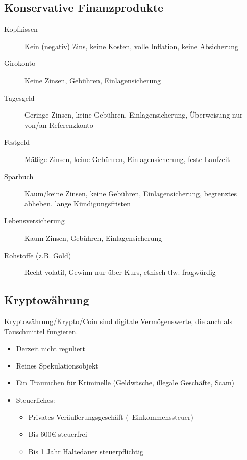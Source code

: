 \documentclass{beamer}
\begin{document}
		\subsection{Konservative Finanzprodukte}
		
			\begin{frame}
				\begin{description}
					\item[Kopfkissen] Kein (negativ) Zins, keine Kosten, volle Inflation, keine Absicherung\pause
					\item[Girokonto] Keine Zinsen, Gebühren, Einlagensicherung\pause
					\item[Tagesgeld] Geringe Zinsen, keine Gebühren, Einlagensicherung, Überweisung nur von/an Referenzkonto\pause
					\item[Festgeld] Mäßige Zinsen, keine Gebühren, Einlagensicherung, feste Laufzeit\pause
					\item[Sparbuch] Kaum/keine Zinsen, keine Gebühren, Einlagensicherung, begrenztes abheben, lange Kündigungsfristen\pause
					\item[Lebensversicherung] Kaum Zinsen, Gebühren, Einlagensicherung\pause
					\item[Rohstoffe (z.B. Gold)] Recht volatil, Gewinn nur über Kurs, ethisch tlw. fragwürdig
				\end{description}
			\end{frame}
		
		\subsection{Kryptowährung}
		
			\begin{frame}
				\begin{definition}
					Kryptowährung/Krypto/Coin sind digitale Vermögenswerte, die auch als Tauschmittel fungieren.\citewiki[Kryptowährung]{Kryptow\%C3\%A4hrung}
				\end{definition}
			
				\begin{itemize}
					\item Derzeit nicht reguliert
					\item Reines Spekulationsobjekt
					\item Ein Träumchen für Kriminelle (Geldwäsche, illegale Geschäfte, Scam)
					\item Steuerliches:
					\begin{itemize}
						\item Privates Veräußerungsgeschäft (\textrightarrow\ Einkommenssteuer)
						\item Bis 600€ steuerfrei
						\item Bis 1 Jahr Haltedauer steuerpflichtig
					\end{itemize}
				\end{itemize}
			\end{frame}
	
\end{document}
